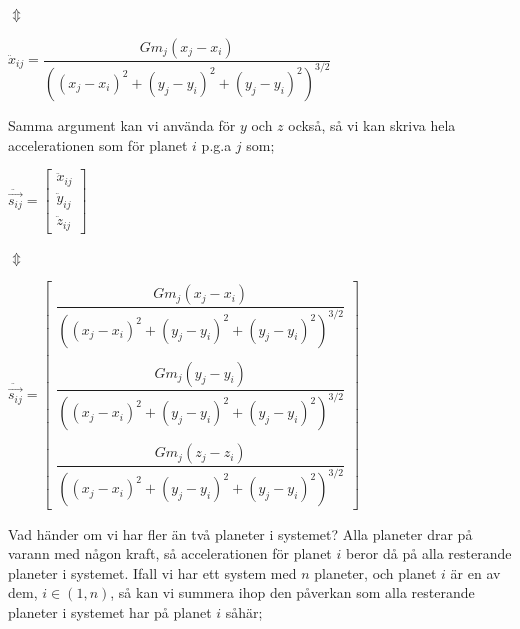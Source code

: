 \documentclass[10pt, a4paper]{amsart}
\begin{document}
\hspace{10ex}
$ \Updownarrow $
\bigskip

\hspace{5ex}
$ \ddot x_{ij} = \dfrac{Gm_j(x_j - x_i)}{((x_j - x_i)^2+(y_j - y_i)^2+(y_j - y_i)^2)^{3/2}} $
\bigskip
\bigskip

Samma argument kan vi använda för $ y $ och $ z $ också, så vi kan skriva hela accelerationen som för planet $ i $ p.g.a $ j $ som;
\bigskip

\bigskip
\hspace{5ex}
$ \ddot \vec{s_{ij}} = 
    \begin{bmatrix}
    \ddot x_{ij} \\
    \ddot y_{ij} \\
    \ddot z_{ij} 
    \end{bmatrix} $
\bigskip

\hspace{10ex}
$ \Updownarrow $
\bigskip

\hspace{5ex}
$ \ddot \vec{s_{ij}} = 
    \begin{bmatrix}
    \dfrac{Gm_j(x_j - x_i)}{((x_j - x_i)^2+(y_j - y_i)^2+(y_j - y_i)^2)^{3/2}} \\ \\
    \dfrac{Gm_j(y_j - y_i)}{((x_j - x_i)^2+(y_j - y_i)^2+(y_j - y_i)^2)^{3/2}} \\ \\
    \dfrac{Gm_j(z_j - z_i)}{((x_j - x_i)^2+(y_j - y_i)^2+(y_j - y_i)^2)^{3/2}}
    \end{bmatrix} $
\bigskip
\bigskip

Vad händer om vi har fler än två planeter i systemet? Alla planeter drar på varann med någon kraft, 
så accelerationen för planet $ i $ beror då på alla resterande planeter i systemet. 
Ifall vi har ett system med $ n $ planeter, och planet $ i $ är en av dem, 
$ i \in \left(1, n\right) $,
så kan vi summera ihop den påverkan som alla resterande planeter i systemet har på planet $ i $ såhär;
\bigskip
\end{document}
